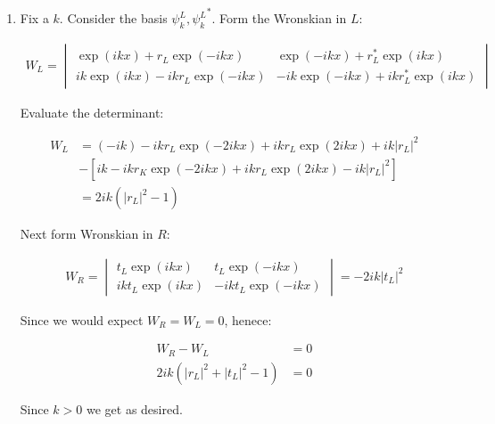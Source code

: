 \begin{mystsolution}\begin{enumerate}
\item Fix a $k$. Consider the basis $\psi_k^L, {\psi_k^L}^*$. Form the Wronskian in $L$:

\begin{equation}
\begin{aligned}
W_L=\begin{vmatrix}
\exp(ikx)+r_L\exp(-ikx) &   \exp(-ikx)+r_L^*\exp(ikx) \\
ik\exp(ikx)-ikr_L\exp(-ikx) & -ik\exp(-ikx)+ikr_L^*\exp(ikx)
\end{vmatrix}
\end{aligned}
\end{equation}


Evaluate the determinant:

\begin{equation}
\begin{aligned}
W_L &= (-ik)-ikr_L\exp(-2ikx) + ikr_L\exp(2ikx)+ik|r_L|^2  \\
&-[ik-ikr_K\exp(-2ikx)+ikr_L\exp(2ikx)-ik|r_L|^2]  \\
&= 2ik(|r_L|^2-1)
\end{aligned}
\end{equation}


Next form Wronskian in $R$:

\begin{equation}
\begin{aligned}
W_R = \begin{vmatrix}
t_L\exp(ikx) & t_L\exp(-ikx) \\
ikt_L\exp(ikx) & -ikt_L\exp(-ikx) 
\end{vmatrix} = -2ik|t_L|^2
\end{aligned}
\end{equation}


Since we would expect $W_R=W_L=0$, henece:

\begin{equation}
\begin{aligned}
W_R-W_L&=0 \\
2ik(|r_L|^2+|t_L|^2-1) &=0
\end{aligned}
\end{equation}


Since $k>0$ we get as desired.
\end{enumerate}


\end{mystsolution}
